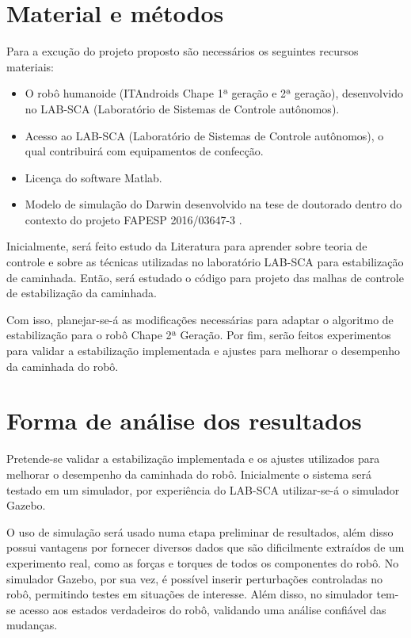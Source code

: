 \newpage

\section{Material e métodos}

Para a excução do projeto proposto são necessários os seguintes recursos materiais:

\begin{itemize}

\item O robô humanoide (ITAndroids Chape 1ª geração e 2ª geração), desenvolvido no LAB-SCA (Laboratório de Sistemas de Controle autônomos).

\item Acesso ao LAB-SCA (Laboratório de Sistemas de Controle autônomos), o qual contribuirá com equipamentos de confecção.

\item Licença do software Matlab.

\item Modelo de simulação do Darwin desenvolvido na tese de doutorado dentro do contexto do projeto FAPESP 2016/03647-3 \cite{tesemarcos}.

\end{itemize}


Inicialmente, será feito estudo da Literatura para aprender sobre teoria de controle e sobre as técnicas utilizadas no laboratório LAB-SCA para estabilização de caminhada. Então, será estudado o código para projeto das malhas de controle de estabilização da caminhada.

Com isso, planejar-se-á as modificações necessárias para adaptar o algoritmo de estabilização para o robô Chape 2ª Geração. Por fim, serão feitos experimentos para validar a estabilização implementada e ajustes para melhorar o desempenho da caminhada do robô.

\newpage


\section{Forma de análise dos resultados}

Pretende-se validar a estabilização implementada e os ajustes utilizados para melhorar o desempenho da caminhada do robô. Inicialmente o sistema será testado em um simulador, por experiência do LAB-SCA utilizar-se-á o simulador Gazebo.

O uso de simulação será usado numa etapa preliminar de resultados, além disso possui vantagens por fornecer diversos dados que são dificilmente extraídos de um experimento real, como as forças e torques de todos os componentes do robô. No simulador Gazebo, por sua vez, é possível inserir perturbações controladas no robô, permitindo testes em situações de interesse. Além disso, no simulador tem-se acesso aos estados verdadeiros do robô, validando uma análise confiável das mudanças.

